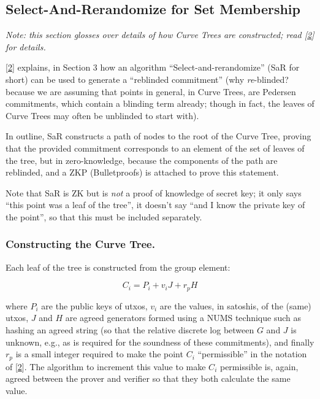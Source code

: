 \documentclass[10pt,a4paper]{article}
\begin{document}
\subsection{Select-And-Rerandomize for Set Membership}

\emph{Note: this section glosses over details of how Curve Trees are constructed; read {[}\protect\hyperlink{anchor-2}{2}{]} for details.}

\vspace{5 pt}

{[}\protect\hyperlink{anchor-2}{2}{]} explains, in Section 3 how an algorithm ``Select-and-rerandomize'' (SaR for short) can be used to generate a ``reblinded commitment'' (why \emph{re}-blinded? because we are assuming that points in general, in Curve Trees, are Pedersen commitments, which contain a blinding term already; though in fact, the leaves of Curve Trees may often be unblinded to start with).

\vspace{5 pt}

In outline, SaR constructs a path of nodes to the root of the Curve Tree, proving that the provided commitment corresponds to an element of the set of leaves of the tree, but in zero-knowledge, because the components of the path are reblinded, and a ZKP (Bulletproofs) is attached to prove this statement.

\vspace{5 pt}

Note that SaR is ZK but is \emph{not} a proof of knowledge of secret key; it only says ``this point was a leaf of the tree'', it doesn't say ``and I know the private key of the point'', so that this must be included separately.

\subsubsection{Constructing the Curve Tree.}

Each leaf of the tree is constructed from the group element:

$$C_i = P_i + v_iJ + r_pH$$

where $P_i$ are the public keys of utxos, $v_i$ are the values, in satoshis, of the (same) utxos, $J$ and $H$ are agreed generators formed using a NUMS technique such as hashing an agreed string (so that the relative discrete log between $G$ and $J$ is unknown, e.g., as is required for the soundness of these commitments), and finally $r_p$ is a small integer required to make the point $C_i$ ``permissible'' in the notation of {[}\protect\hyperlink{anchor-2}{2}{]}. The algorithm to increment this value to make $C_i$ permissible is, again, agreed between the prover and verifier so that they both calculate the same value.
\end{document}

